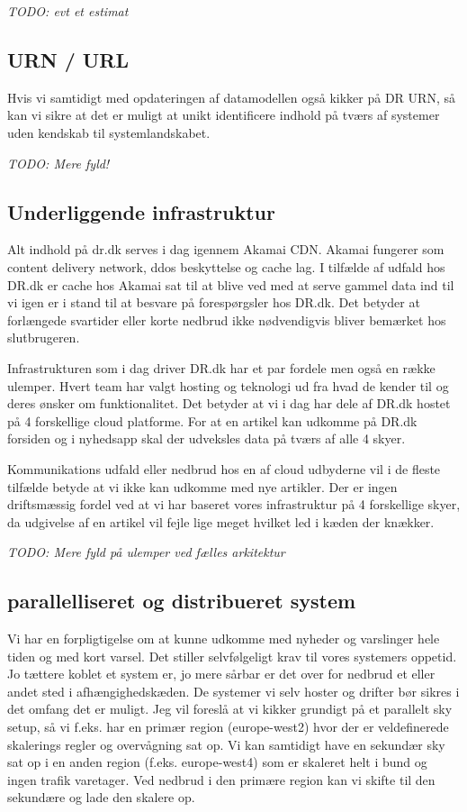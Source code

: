 \documentclass{article}
\begin{document}
    \textit{TODO: evt et estimat}


\subsection{URN / URL}
Hvis vi samtidigt med opdateringen af datamodellen også kikker på DR URN, så kan vi sikre at det er muligt at unikt identificere indhold på tværs af systemer uden kendskab til systemlandskabet. 

    \textit{TODO: Mere fyld!}

\subsection{Underliggende infrastruktur}
Alt indhold på dr.dk serves i dag igennem Akamai CDN. Akamai fungerer som content delivery network, ddos beskyttelse og cache lag. I tilfælde af udfald hos DR.dk er cache hos Akamai sat til at blive ved med at serve gammel data ind til vi igen er i stand til at besvare på forespørgsler hos DR.dk. Det betyder at forlængede svartider eller korte nedbrud ikke nødvendigvis bliver bemærket hos slutbrugeren.

Infrastrukturen som i dag driver DR.dk har et par fordele men også en række ulemper. Hvert team har valgt hosting og teknologi ud fra hvad de kender til og deres ønsker om funktionalitet. Det betyder at vi i dag har dele af DR.dk hostet på 4 forskellige cloud platforme.
For at en artikel kan udkomme på DR.dk forsiden og i nyhedsapp skal der udveksles data på tværs af alle 4 skyer.

Kommunikations udfald eller nedbrud hos en af cloud udbyderne vil i de fleste tilfælde betyde at vi ikke kan udkomme med nye artikler. Der er ingen driftsmæssig fordel ved at vi har baseret vores infrastruktur på 4 forskellige skyer, da udgivelse af en artikel vil fejle lige meget hvilket led i kæden der knækker. 

    \textit{TODO: Mere fyld på ulemper ved fælles arkitektur}


\subsection{parallelliseret og distribueret system}
Vi har en forpligtigelse om at kunne udkomme med nyheder og varslinger hele tiden og med kort varsel. Det stiller selvfølgeligt krav til vores systemers oppetid. Jo tættere koblet et system er, jo mere sårbar er det over for nedbrud et eller andet sted i afhængighedskæden.
De systemer vi selv hoster og drifter bør sikres i det omfang det er muligt. Jeg vil foreslå at vi kikker grundigt på et parallelt sky setup, så vi f.eks. har en primær region (europe-west2) hvor der er veldefinerede skalerings regler og overvågning sat op. Vi kan samtidigt have en sekundær sky sat op i en anden region (f.eks. europe-west4) som er skaleret helt i bund og ingen trafik varetager.
Ved nedbrud i den primære region kan vi skifte til den sekundære og lade den skalere op.
\end{document}
